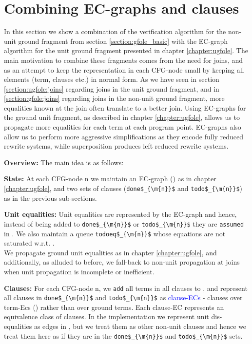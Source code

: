 \section{Combining EC-graphs and clauses}\label{section:appendix:gfole_ECGraph}
In this section we show a combination of the verification algorithm for the non-unit ground fragment from section \ref{section:gfole_basic} with the EC-graph algorithm for the unit ground fragment presented in chapter \ref{chapter:ugfole}.
The main motivation to combine these fragments comes from the need for joins, and as an attempt to keep the representation in each CFG-node small by keeping all elements (term, clauses etc.) in normal form.
As we have seen in section \ref{section:ugfole:joins} regarding joins in the unit ground fragment, and in \ref{section:gfole:joins} regarding joins in the non-unit ground fragment, more equalities known at the join often translate to a better join.
Using EC-graphs for the ground unit fragment, as described in chapter \ref{chapter:ugfole}, allows us to propagate more equalities for each term at each program point.
EC-graphs also allow us to perform more aggressive simplifications as they encode fully reduced rewrite systems, while superposition produces left reduced rewrite systems.

\textbf{Overview:}
The main idea is as follows:

\textbf{State:} At each CFG-node n we maintain an EC-graph () as in chapter \ref{chapter:ugfole}, and two sets of clauses (\lstinline|done$_{\m{n}}$| and \lstinline|todo$_{\m{n}}$|) as in the previous sub-sections.

\textbf{Unit equalities:} Unit equalities are represented by the EC-graph and hence, instead of being added to \lstinline|done$_{\m{n}}$| or \lstinline|todo$_{\m{n}}$| they are 
\lstinline|assumed| in . We also maintain a queue \lstinline|todoeq$_{\m{n}}$| whose equations are not saturated w.r.t. \SPG{}.\\
We propagate ground unit equalities as in chapter \ref{chapter:ugfole}, and additionally, as alluded to before, we fall-back to non-unit propagation at joins when unit propagation is incomplete or inefficient.

\textbf{Clauses:} For each CFG-node n, we \lstinline|add| all terms in all clauses to , and represent all clauses in 
\lstinline|done$_{\m{n}}$| and \lstinline|todo$_{\m{n}}$| as \textcolor{blue}{clause-ECs} - clauses over term-Ecs (\GTs{}) rather than over ground terms. Each clause-EC represents an equivalence class of clauses. In the implementation we represent unit dis-equalities as edges in , but we treat them as other non-unit clauses and hence we treat them here as if they are in the \lstinline|done$_{\m{n}}$| and \lstinline|todo$_{\m{n}}$| sets.

